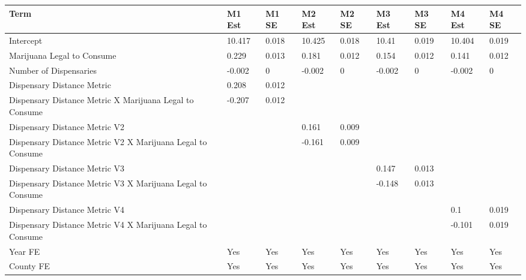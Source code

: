 \begin{tabular}{lllllllll}
  \hline
Term & M1 Est & M1 SE & M2 Est & M2 SE & M3 Est & M3 SE & M4 Est & M4 SE \\ 
  \hline
Intercept & 10.417 & 0.018 & 10.425 & 0.018 & 10.41 & 0.019 & 10.404 & 0.019 \\ 
  Marijuana Legal to Consume & 0.229 & 0.013 & 0.181 & 0.012 & 0.154 & 0.012 & 0.141 & 0.012 \\ 
  Number of Dispensaries & -0.002 & 0 & -0.002 & 0 & -0.002 & 0 & -0.002 & 0 \\ 
  Dispensary Distance Metric & 0.208 & 0.012 &  &  &  &  &  &  \\ 
  Dispensary Distance Metric X Marijuana Legal to Consume & -0.207 & 0.012 &  &  &  &  &  &  \\ 
  Dispensary Distance Metric V2 &  &  & 0.161 & 0.009 &  &  &  &  \\ 
  Dispensary Distance Metric V2 X Marijuana Legal to Consume &  &  & -0.161 & 0.009 &  &  &  &  \\ 
  Dispensary Distance Metric V3 &  &  &  &  & 0.147 & 0.013 &  &  \\ 
  Dispensary Distance Metric V3 X Marijuana Legal to Consume &  &  &  &  & -0.148 & 0.013 &  &  \\ 
  Dispensary Distance Metric V4 &  &  &  &  &  &  & 0.1 & 0.019 \\ 
  Dispensary Distance Metric V4 X Marijuana Legal to Consume &  &  &  &  &  &  & -0.101 & 0.019 \\ 
  Year FE & Yes & Yes & Yes & Yes & Yes & Yes & Yes & Yes \\ 
  County FE & Yes & Yes & Yes & Yes & Yes & Yes & Yes & Yes \\ 
   \hline
\end{tabular}
